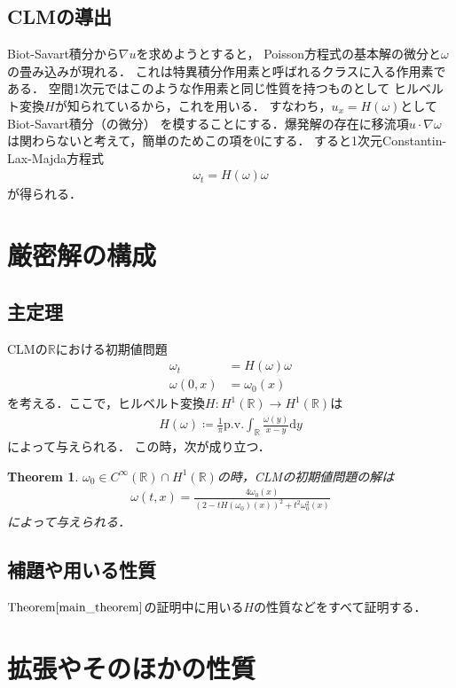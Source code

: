 \documentclass[dvipdfmx,autodetect-engine]{jsarticle}
\newtheorem{theorem}{Theorem}[section]
\theoremstyle{remark}
\theoremstyle{definition}
\newcommand{\R}{\mathbb{R}}
\begin{document}
\subsection{CLMの導出}
Biot-Savart積分から$\nabla u$を求めようとすると，
Poisson方程式の基本解の微分と$\omega$の畳み込みが現れる．
これは特異積分作用素と呼ばれるクラスに入る作用素である．
空間1次元ではこのような作用素と同じ性質を持つものとして
ヒルベルト変換$H$が知られているから，これを用いる．
すなわち，$u_x = H(\omega)$としてBiot-Savart積分（の微分）
を模することにする．爆発解の存在に移流項$u\cdot \nabla \omega$
は関わらないと考えて，簡単のためこの項を0にする．
すると1次元Constantin-Lax-Majda方程式
\begin{align*}
    \omega_t = H(\omega)\omega 
\end{align*}
が得られる．
\section{厳密解の構成}
\subsection{主定理}
CLMの$\R$における初期値問題
\begin{align*}
    \omega_t &= H(\omega)\omega \\
    \omega(0,x) &= \omega_0(x)
\end{align*}
を考える．ここで，ヒルベルト変換$H:H^1(\R)\to H^1(\R)$は
\begin{align*}
    H(\omega) \coloneqq \frac{1}{\pi} \mathrm{p.v.} \int_{\R} \frac{\omega(y)}{x-y} \mathrm{d}y
\end{align*}
によって与えられる．
この時，次が成り立つ．
\begin{theorem}\label{main_theorem}
    $\omega_0 \in C^{\infty}(\R) \cap H^{1}(\R)$の時，CLMの初期値問題の解は
    \begin{align*}
        \omega (t,x) = \frac{4\omega_0 (x)}{(2-tH(\omega_0)(x))^2 + t^2 \omega_0^2(x)}
    \end{align*}
    によって与えられる．
\end{theorem}

\subsection{補題や用いる性質}
$\mathrm{Theorem} \ref{main_theorem}$の証明中に用いる$H$の性質などをすべて証明する．
\section{拡張やそのほかの性質}
    
\end{document}

